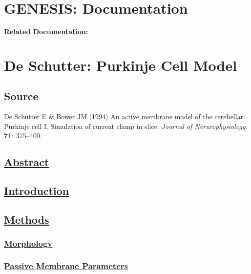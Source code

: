 \documentclass[12pt]{article}
\begin{document}
\section*{GENESIS: Documentation}

{\bf Related Documentation:}

\section*{De Schutter: Purkinje Cell Model}

\subsection*{Source}

De Schutter E \& Bower JM (1994) An active membrane model of the cerebellar Purkinje cell I. Simulation of current clamp in slice. {\it Journal of Nerurophysiology}. {\bf 71}: 375--400.

\subsection*{\href{pub-purkinje-deschutter-abstract/pub-purkinje-deschutter-abstract.tex}{\bf Abstract}}

\subsection*{\href{pub-purkinje-deschutter-introduction/pub-purkinje-deschutter-introduction.tex}{\bf Introduction}}

\subsection*{\href{pub-purkinje-deschutter-methods/pub-purkinje-deschutter-methods.tex}{\bf Methods}}

\subsubsection*{\href{pub-purkinje-deschutter-morphology/pub-purkinje-deschutter-morphology.tex}{\bf Morphology}}

\subsubsection*{\href{pub-purkinje-deschutter-passive/pub-purkinje-deschutter-passive.tex}{\bf Passive Membrane Parameters}}
\end{document}
